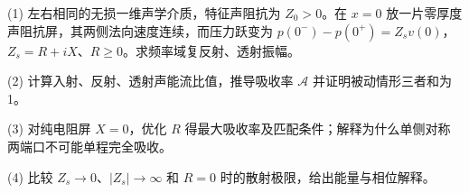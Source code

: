 (1) 左右相同的无损一维声学介质，特征声阻抗为 \(Z_0>0\)。在 \(x=0\) 放一片零厚度声阻抗屏，其两侧法向速度连续，而压力跃变为 \(p(0^-)-p(0^+)=Z_s v(0)\)，\(Z_s=R+iX\)、\(R\ge0\)。求频率域复反射、透射振幅。

(2) 计算入射、反射、透射声能流比值，推导吸收率 \(\mathcal A\) 并证明被动情形三者和为1。

(3) 对纯电阻屏 \(X=0\)，优化 \(R\) 得最大吸收率及匹配条件；解释为什么单侧对称两端口不可能单程完全吸收。

(4) 比较 \(Z_s\to0\)、\(|Z_s|\to\infty\) 和 \(R=0\) 时的散射极限，给出能量与相位解释。
